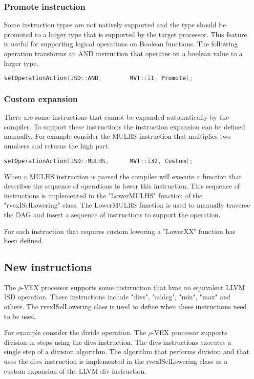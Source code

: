 \subsubsection{Promote instruction}
Some instruction types are not natively supported and the type should be promoted to a larger type that is supported by the target processor. This feature is useful for supporting logical operations on Boolean functions. The following operation transforms an AND instruction that operates on a boolean value to a larger type.

\begin{lstlisting}[language=c] 
setOperationAction(ISD::AND,        MVT::i1, Promote);
\end{lstlisting}

\subsubsection{Custom expansion}
There are some instructions that cannot be expanded automatically by the compiler. To support these instructions the instruction expansion can be defined manually. For example consider the MULHS instruction that multiplies two numbers and returns the high part.

\begin{lstlisting}[language=c] 
setOperationAction(ISD::MULHS,      MVT::i32, Custom);
\end{lstlisting}

When a MULHS instruction is parsed the compiler will execute a function that describes the sequence of operations to lower this instruction. This sequence of instructions is implemented in the "LowerMULHS" function of the "rvexISelLowering" class. The LowerMULHS function is used to manually traverse the DAG and insert a sequence of instructions to support the operation.

For each instruction that requires custom lowering a "LowerXX" function has been defined.

\subsection{New instructions}
The $\rho$-VEX processor supports some instrruction that hvae no equivalent LLVM ISD operation. These instructions include "divs", "addcg", "min", "max" and others. The rvexISelLowering class is used to define when these instructions need to be used.

For example consider the divide operation. The $\rho$-VEX processor supports division in steps using the divs instruction. The divs instructions executes a single step of a division algorithm. The algorithm that performs division and that uses the divs instruction is implemented in the rvexISelLowering class as a custom expansion of the LLVM div instruction.


